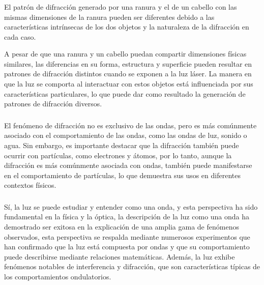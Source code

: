\documentclass[twocolumn, 12pt]{article}
\begin{document}
\subsubsection{}

El patrón de difracción generado por una ranura y el de un
cabello con las mismas dimensiones de la ranura pueden ser
diferentes debido a las características intrínsecas de los
dos objetos y la naturaleza de la difracción en cada caso.

A pesar de que una ranura y un cabello puedan compartir
dimensiones físicas similares, las diferencias en su forma,
estructura y superficie pueden resultar en patrones de
difracción distintos cuando se exponen a la luz láser. La
manera en que la luz se comporta al interactuar con estos
objetos está influenciada por sus características
particulares, lo que puede dar como resultado la generación
de patrones de difracción diversos.

\subsubsection{}

El fenómeno de difracción no es exclusivo de las ondas,
pero es más comúnmente asociado con el comportamiento de
las ondas, como las ondas de luz, sonido o agua. Sin
embargo, es importante destacar que la difracción también
puede ocurrir con partículas, como electrones y átomos, por
lo tanto, aunque la difracción es más comúnmente asociada
con ondas, también puede manifestarse en el comportamiento
de partículas, lo que demuestra sus usos en diferentes
contextos físicos.

\subsubsection{}

Sí, la luz se puede estudiar y entender como una onda, y
esta perspectiva ha sido fundamental en la física y la
óptica, la descripción de la luz como una onda ha
demostrado ser exitosa en la explicación de una amplia gama
de fenómenos observados, esta perspectiva se respalda
mediante numerosos experimentos que han confirmado que la
luz está compuesta por ondas y que su comportamiento puede
describirse mediante relaciones matemáticas. Además, la luz
exhibe fenómenos notables de interferencia y difracción,
que son características típicas de los comportamientos
ondulatorios.
\end{document}
